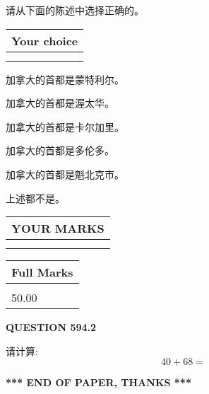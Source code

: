 \documentclass{ctexart}
\begin{document}
  
请从下面的陈述中选择正确的。
  
  
\noindent\hspace{3.0in} \begin{tabular}{|l|}
\hline
Your choice \\
\hline
 \\ 
 \\ 
\hline
\end{tabular}
  
  
 
 
加拿大的首都是蒙特利尔。
 
 
加拿大的首都是渥太华。
 
 
加拿大的首都是卡尔加里。
 
 
加拿大的首都是多伦多。
 
 
加拿大的首都是魁北克市。
 
 
 上述都不是。
 
 
  
\vspace{0.2in}
  
\noindent\begin{tabular}{|l|}
\hline
 YOUR MARKS  \\
\hline
 \\ 
 \\ 
\hline
\end{tabular}
\hspace{0.05in} \begin{tabular}{|l|}
\hline
 Full Marks  \\
\hline
 \\ 
50.00 \\
\hline
\end{tabular}
{\textbf{\Large{QUESTION
594.2 
}}}
  
  
 
请计算:
\begin{equation}
40 +  %
68 = \nonumber
\end{equation}
 

 

 
   
   
 \vspace{0.2in}
 
   
   
   
   
\vspace{1.0in} 
{\textbf{\large{ *** END OF PAPER, THANKS *** }}} 
   
\end{document}
